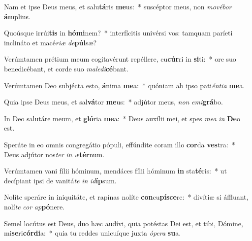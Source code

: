 \item Nam et ipse Deus meus, et salu\textbf{tá}ris \textbf{me}us:~* suscéptor meus, non \textit{mo}\textit{vé}\textit{bor} \textbf{ám}plius.
\item Quoúsque irrúi\textbf{tis} in \textbf{hó}\textbf{mi}nem?~* interfícitis univérsi vos: tamquam paríeti inclináto et macé\textit{ri}\textit{æ} \textit{de}\textbf{púl}sæ?
\item Verúmtamen prétium meum cogitavérunt repéllere, cu\textbf{cúr}ri in \textbf{si}ti:~* ore suo benedicébant, et corde suo \textit{ma}\textit{le}\textit{di}\textbf{cé}bant.
\item Verúmtamen Deo subjécta esto, \textbf{á}nima \textbf{me}a:~* quóniam ab ipso pati\textit{én}\textit{ti}\textit{a} \textbf{me}a.
\item Quia ipse Deus meus, et sal\textbf{vá}tor \textbf{me}us:~* adjútor meus, \textit{non} \textit{e}\textit{mi}\textbf{grá}bo.
\item In Deo salutáre meum, et \textbf{gló}ria \textbf{me}a:~* Deus auxílii mei, et spes \textit{me}\textit{a} \textit{in} \textbf{De}o est.
\item Speráte in eo omnis congregátio pópuli, effúndite coram illo \textbf{cor}da \textbf{ves}tra:~* Deus adjútor nos\textit{ter} \textit{in} \textit{æ}\textbf{tér}num.
\item Verúmtamen vani fílii hóminum, mendáces fílii hóminum \textbf{in} sta\textbf{té}ris:~* ut decípiant ipsi de vanitá\textit{te} \textit{in} \textit{id}\textbf{íp}sum.
\item Nolíte speráre in iniquitáte, et rapínas nolíte \textbf{con}cu\textbf{pí}\textbf{sce}re:~* divítiæ si áffluant, nolí\textit{te} \textit{cor} \textit{ap}\textbf{pó}nere.
\item Semel locútus est Deus, duo hæc audívi, quia potéstas Dei est, et tibi, Dómine, mi\textbf{se}ri\textbf{cór}\textbf{di}a:~* quia tu reddes unicuíque juxta \textit{ó}\textit{pe}\textit{ra} \textbf{su}a.

